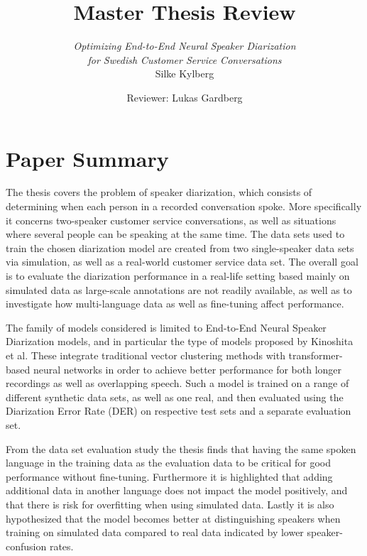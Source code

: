 \documentclass{article}
\title{Master Thesis Review}
\author{\textit{Optimizing End-to-End Neural Speaker Diarization} \\ \textit{for Swedish Customer Service Conversations} \\ Silke Kylberg}
\date{Reviewer: Lukas Gardberg}
\begin{document}
\maketitle

\section{Paper Summary}


The thesis covers the problem of speaker diarization, which consists of determining when each person in a recorded conversation spoke. More specifically it concerns two-speaker customer service conversations, as well as situations where several people can be speaking at the same time. The data sets used to train the chosen diarization model are created from two single-speaker data sets via simulation, as well as a real-world customer service data set. The overall goal is to evaluate the diarization performance in a real-life setting based mainly on simulated data as large-scale annotations are not readily available, as well as to investigate how multi-language data as well as fine-tuning affect performance.

The family of models considered is limited to End-to-End Neural Speaker Diarization models, and in particular the type of models proposed by Kinoshita et al. These integrate traditional vector clustering methods with transformer-based neural networks in order to achieve better performance for both longer recordings as well as overlapping speech. Such a model is trained on a range of different synthetic data sets, as well as one real, and then evaluated using the Diarization Error Rate (DER) on respective test sets and a separate evaluation set.

From the data set evaluation study the thesis finds that having the same spoken language in the training data as the evaluation data to be critical for good performance without fine-tuning. Furthermore it is highlighted that adding additional data in another language does not impact the model positively, and that there is risk for overfitting when using simulated data. Lastly it is also hypothesized that the model becomes better at distinguishing speakers when training on simulated data compared to real data indicated by lower speaker-confusion rates.
\end{document}
